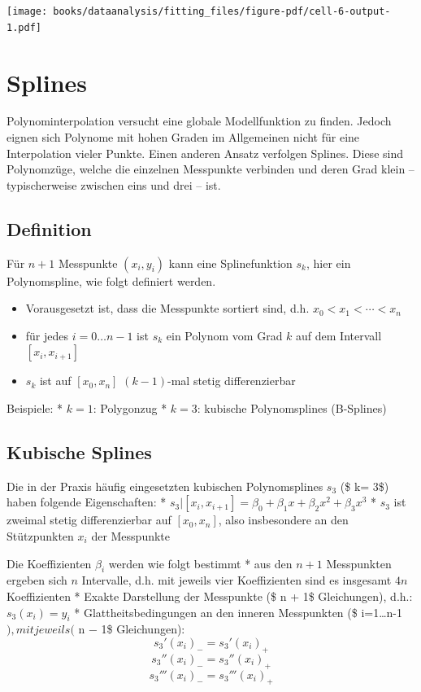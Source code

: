 \documentclass[
  letterpaper,
  DIV=11,
  numbers=noendperiod]{scrreprt}
\providecommand{\tightlist}{%
  \setlength{\itemsep}{0pt}\setlength{\parskip}{0pt}}\usepackage{longtable,booktabs,array}
\begin{document}
\texttt{[image: books/dataanalysis/fitting\_files/figure-pdf/cell-6-output-1.pdf]}

\chapter{Splines}\label{splines}

Polynominterpolation versucht eine globale Modellfunktion zu finden.
Jedoch eignen sich Polynome mit hohen Graden im Allgemeinen nicht für
eine Interpolation vieler Punkte. Einen anderen Ansatz verfolgen
Splines. Diese sind Polynomzüge, welche die einzelnen Messpunkte
verbinden und deren Grad klein -- typischerweise zwischen eins und drei
-- ist.

\section{Definition}\label{definition}

Für \(n+1\) Messpunkte \((x_i, y_i)\) kann eine Splinefunktion \(s_k\),
hier ein Polynomspline, wie folgt definiert werden.

\begin{itemize}
\tightlist
\item
  Vorausgesetzt ist, dass die Messpunkte sortiert sind, d.h.
  \(x_0 < x_1 < \cdots < x_n\)
\item
  für jedes \(i = 0\dots n − 1\) ist \(s_k\) ein Polynom vom Grad \(k\)
  auf dem Intervall \(\left[x_i , x_{i+1}\right]\)
\item
  \(s_k\) ist auf \(\left[x_0 , x_n \right]\) \((k − 1)\)-mal stetig
  differenzierbar
\end{itemize}

Beispiele: * \(k = 1\): Polygonzug * \(k = 3\): kubische Polynomsplines
(B-Splines)

\section{Kubische Splines}\label{kubische-splines}

Die in der Praxis häufig eingesetzten kubischen Polynomsplines \(s_3\)
(\$ k= 3\$) haben folgende Eigenschaften: *
\(s_3|\left[x_i,x_{i+1}\right] = \beta_0 +\beta_1 x + \beta_2 x^2 + \beta_3 x^3\)
* \(s_3\) ist zweimal stetig differenzierbar auf
\(\left[x_0,x_n\right]\), also insbesondere an den Stützpunkten \(x_i\)
der Messpunkte

Die Koeffizienten \(\beta_i\) werden wie folgt bestimmt * aus den
\(n + 1\) Messpunkten ergeben sich \(n\) Intervalle, d.h. mit jeweils
vier Koeffizienten sind es insgesamt \(4n\) Koeffizienten * Exakte
Darstellung der Messpunkte (\$ n + 1\$ Gleichungen), d.h.:
\(s_3(x_i) = y_i\) * Glattheitsbedingungen an den inneren Messpunkten
(\$ i=1\dots n-1\(), mit jeweils (\) n − 1\$ Gleichungen):
\[ s_3'(x_i)_- =s_3'(x_i)_+\] \[ s_3''(x_i)_- =s_3''(x_i)_+\]
\[ s_3'''(x_i)_- =s_3'''(x_i)_+\]
\end{document}
